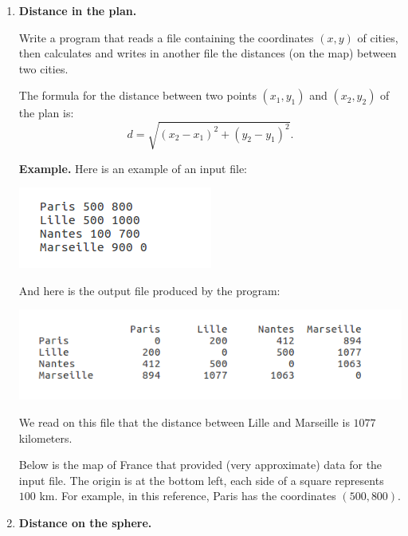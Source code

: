 \documentclass[11pt,class=report,crop=false]{standalone}
\begin{document}
\begin{activite}


\begin{enumerate}
  \item \textbf{Distance in the plan.} 
  
  Write a program that reads a file containing the coordinates $(x,y)$ of cities, then calculates and writes in another file the distances (on the map) between two cities.
  
  The formula for the distance between two points $(x_1,y_1)$ and $(x_2,y_2)$ of the plan is:
  $$d = \sqrt{(x_2-x_1)^2 + (y_2-y_1)^2}.$$
  
  
\textbf{Example.} Here is an example of an input file:
\begin{center}
\includegraphics[scale=\myscale,scale=0.7]{screen-files-4a}
\end{center}   

And here is the output file produced by the program:
\begin{center}
\includegraphics[scale=\myscale,scale=0.7]{screen-files-4b} 
\end{center}   
We read on this file that the distance between Lille and Marseille is $1077$ kilometers.


Below is the map of France that provided (very approximate) data for the input file. The origin is at the bottom left, each side of a square represents $100$ km. For example, in this reference, Paris has the coordinates $(500,800)$.
 

  \item \textbf{Distance on the sphere.} 
  

\end{enumerate}
\end{activite}
\end{document}
